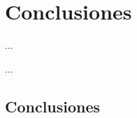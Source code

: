\chapter{Conclusiones}

\begin{FraseCelebre}
\begin{Frase}
...
\end{Frase}
\begin{Fuente}
...
\end{Fuente}
\end{FraseCelebre}

\section{Conclusiones}
\label{cap32:sec:Conclusiones}

